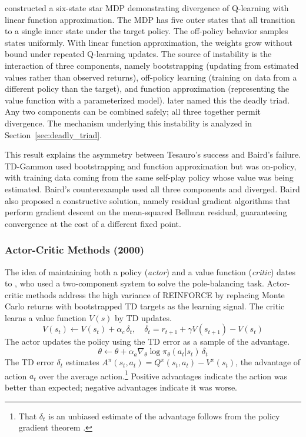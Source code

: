 \citet{Baird1995} constructed a six-state star MDP demonstrating divergence of Q-learning with linear function approximation. The MDP has five outer states that all transition to a single inner state under the target policy. The off-policy behavior samples states uniformly. With linear function approximation, the weights grow without bound under repeated Q-learning updates. The source of instability is the interaction of three components, namely bootstrapping (updating from estimated values rather than observed returns), off-policy learning (training on data from a different policy than the target), and function approximation (representing the value function with a parameterized model). \citet{sutton2018} later named this the deadly triad. Any two components can be combined safely; all three together permit divergence. The mechanism underlying this instability is analyzed in Section~\ref{sec:deadly_triad}.

This result explains the asymmetry between Tesauro's success and Baird's failure. TD-Gammon used bootstrapping and function approximation but was on-policy, with training data coming from the same self-play policy whose value was being estimated. Baird's counterexample used all three components and diverged. Baird also proposed a constructive solution, namely residual gradient algorithms that perform gradient descent on the mean-squared Bellman residual, guaranteeing convergence at the cost of a different fixed point.

\subsubsection{Actor-Critic Methods (2000)}

The idea of maintaining both a policy (\textit{actor}) and a value function (\textit{critic}) dates to \citet{barto1983neuronlike}, who used a two-component system to solve the pole-balancing task. Actor-critic methods address the high variance of REINFORCE by replacing Monte Carlo returns with bootstrapped TD targets as the learning signal. The critic learns a value function $V(s)$ by TD updates.
\begin{equation}
V(s_t) \leftarrow V(s_t) + \alpha_c \, \delta_t, \quad \delta_t = r_{t+1} + \gamma V(s_{t+1}) - V(s_t)
\end{equation}
The actor updates the policy using the TD error as a sample of the advantage.
\begin{equation}
\theta \leftarrow \theta + \alpha_a \nabla_\theta \log \pi_\theta(a_t|s_t) \, \delta_t
\end{equation}
The TD error $\delta_t$ estimates $A^\pi(s_t, a_t) = Q^\pi(s_t, a_t) - V^\pi(s_t)$, the advantage of action $a_t$ over the average action.\footnote{That $\delta_t$ is an unbiased estimate of the advantage follows from the policy gradient theorem \citep{SuttonMcAllester2000}.} Positive advantages indicate the action was better than expected; negative advantages indicate it was worse.

